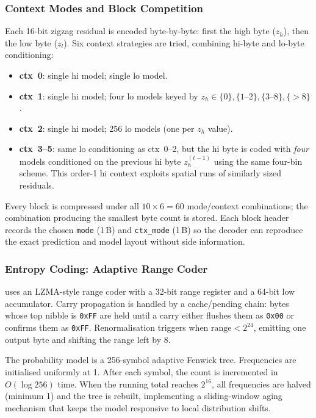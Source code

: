 \subsubsection*{Context Modes and Block Competition}
Each 16-bit zigzag residual is encoded byte-by-byte: first the high byte
($z_h$), then the low byte ($z_l$). Six context strategies are tried,
combining hi-byte and lo-byte conditioning:
\begin{itemize}
  \item \textbf{ctx~0}: single hi model; single lo model.
  \item \textbf{ctx~1}: single hi model; four lo models keyed by
    $z_h \in \{0\},\{1\text{--}2\},\{3\text{--}8\},\{>8\}$.
  \item \textbf{ctx~2}: single hi model; 256 lo models (one per $z_h$ value).
  \item \textbf{ctx~3--5}: same lo conditioning as ctx~0--2, but the hi byte
    is coded with \emph{four} models conditioned on the previous hi byte
    $z_h^{(t-1)}$ using the same four-bin scheme. This order-1 hi context
    exploits spatial runs of similarly sized residuals.
\end{itemize}
Every block is compressed under all $10 \times 6 = 60$ mode/context
combinations; the combination producing the smallest byte count is
stored. Each block header records the chosen \texttt{mode} (1\,B) and
\texttt{ctx\_mode} (1\,B) so the decoder can reproduce the exact prediction
and model layout without side information.

\subsubsection*{Entropy Coding: Adaptive Range Coder}
\cmpfocused{} uses an LZMA-style range coder with a 32-bit range register and a
64-bit low accumulator. Carry propagation is handled by a cache/pending
chain: bytes whose top nibble is \texttt{0xFF} are held until a carry either
flushes them as \texttt{0x00} or confirms them as \texttt{0xFF}.
Renormalisation triggers when $\text{range} < 2^{24}$, emitting one output
byte and shifting the range left by 8.

The probability model is a 256-symbol adaptive Fenwick tree. Frequencies are
initialised uniformly at 1. After each symbol, the count is incremented in
$O(\log 256)$ time. When the running total reaches $2^{16}$, all frequencies
are halved (minimum 1) and the tree is rebuilt, implementing a sliding-window
aging mechanism that keeps the model responsive to local distribution shifts.
